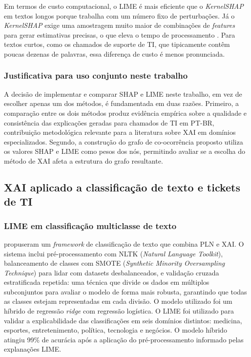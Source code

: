 \documentclass[
    12pt,                %
    openright,           %
    oneside,             %
    a4paper,             %
    english,             %
    brazil               %
]{abntex2}
\begin{document}
Em termos de custo computacional, o LIME é mais eficiente que o 
\textit{KernelSHAP} em textos longos porque trabalha com um número 
fixo de perturbações. Já o \textit{KernelSHAP} exige uma amostragem 
muito maior de combinações de \textit{features} para gerar estimativas 
precisas, o que eleva o tempo de processamento \cite{salih2023}. 
Para textos curtos, como os chamados de suporte de TI, que tipicamente 
contêm poucas dezenas de palavras, essa diferença de custo é menos 
pronunciada.
\subsubsection{Justificativa para uso conjunto neste trabalho}
\label{subsubsec:comparacao_justificativa}

A decisão de implementar e comparar SHAP e LIME neste trabalho, em vez de escolher apenas um dos métodos, é fundamentada em duas razões. Primeiro, a comparação entre os dois métodos produz evidência empírica sobre a qualidade e consistência das explicações geradas para chamados de TI em PT-BR, contribuição metodológica relevante para a literatura sobre XAI em domínios especializados. Segundo, a construção do grafo de co-ocorrência proposto utiliza os 
valores SHAP e LIME como pesos dos nós, permitindo avaliar 
se a escolha do método de XAI afeta a estrutura do grafo resultante.

\subsection{XAI aplicado a classificação de texto e tickets de TI}
\label{subsec:xai_aplicado}

\subsubsection{LIME em classificação multiclasse de texto}
\label{subsubsec:xai_mustafa}

 propuseram um \textit{framework} de 
classificação de texto que combina PLN e XAI. O sistema inclui 
pré-processamento com NLTK (\textit{Natural Language Toolkit}), 
balanceamento de classes com SMOTE (\textit{Synthetic Minority 
Oversampling Technique}) para lidar com datasets desbalanceados, 
e validação cruzada estratificada repetida: uma técnica que divide 
os dados em múltiplos subconjuntos para avaliar o modelo de forma 
mais robusta, garantindo que todas as classes estejam representadas 
em cada divisão. O modelo utilizado foi um híbrido de regressão 
\textit{ridge} com regressão logística. O LIME foi utilizado para 
validar a explicabilidade das classificações em seis domínios 
distintos: medicina, esportes, entretenimento, política, tecnologia 
e negócios. O modelo híbrido atingiu 99\% de acurácia após a 
aplicação do pré-processamento informado pelas explanações LIME.
\end{document}
